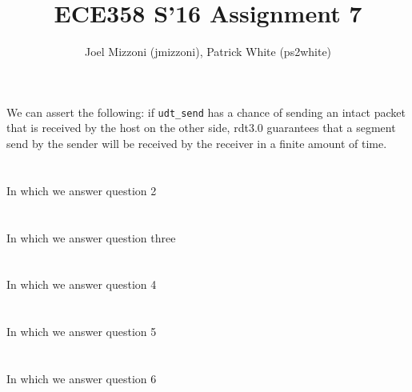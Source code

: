\documentclass[10pt,a4paper]{article}
\author{Joel Mizzoni (jmizzoni), Patrick White (ps2white)}
\begin{document}
\title{ECE358 S'16 Assignment 7}
\maketitle
\section{}
We can assert the following: if \texttt{udt\_send} has a chance of sending an intact packet that is received by the host on the other side, rdt3.0 guarantees that a segment send by the sender will be received by the receiver in a finite amount of time.
\section{}
In which we answer question 2
\section{}
In which we answer question three
\section{}
In which we answer question 4
\section{}
In which we answer question 5
\section{}
In which we answer question 6
\end{document}
